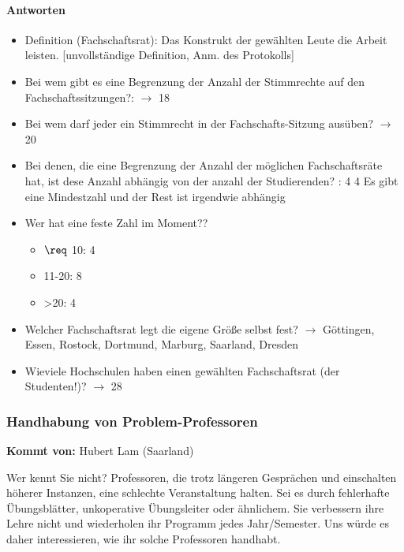       \paragraph{Antworten}
        \begin{itemize}
          \item Definition (Fachschaftsrat): Das Konstrukt der gewählten Leute die Arbeit leisten. [unvollständige Definition, Anm. des Protokolls]
          \item Bei wem gibt es eine Begrenzung der Anzahl der Stimmrechte auf den Fachschaftssitzungen?: $\rightarrow$ 18
          \item Bei wem darf jeder ein Stimmrecht in der Fachschafts-Sitzung ausüben? $\rightarrow$ 20
          \item Bei denen, die eine Begrenzung der Anzahl der möglichen Fachschaftsräte hat, ist dese Anzahl abhängig von der anzahl der Studierenden? : 4
          4
          Es gibt eine Mindestzahl und der Rest ist irgendwie abhängig
          \item Wer hat eine feste Zahl im Moment??
            \begin{itemize}
              \item $\req$ 10: 4 %
              \item 11-20: 8
              \item >20: 4
            \end{itemize}
          \item Welcher Fachschaftsrat legt die eigene Größe selbst fest? $\rightarrow$ Göttingen, Essen, Rostock, Dortmund, Marburg, Saarland, Dresden
          \item Wieviele Hochschulen haben einen gewählten Fachschaftsrat (der Studenten!)? $\rightarrow$ 28
        \end{itemize}

    \subsubsection*{Handhabung von Problem-Professoren}
      \textbf{Kommt von:} Hubert Lam (Saarland)

      Wer kennt Sie nicht? Professoren, die trotz längeren Gesprächen und einschalten höherer Instanzen, eine schlechte Veranstaltung halten. Sei es durch fehlerhafte Übungsblätter, unkoperative Übungsleiter oder ähnlichem. Sie verbessern ihre Lehre nicht und wiederholen ihr Programm jedes Jahr/Semester. Uns würde es daher interessieren, wie ihr solche Professoren handhabt. \\

